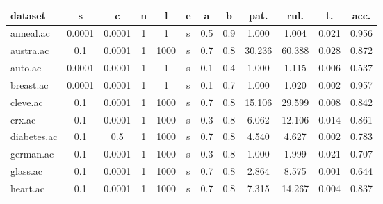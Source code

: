 \begin{table}[htbp]
	\centering
		\begin{tabular}{|l|c|c|c|c|c|c|c||c|c|c|c|}
		\hline
		\textbf{dataset}	& \textbf{s}	& \textbf{c}	& \textbf{n}	& \textbf{l}	& \textbf{e} & \textbf{a} & \textbf{b} & \textbf{pat.}	& \textbf{rul.}	& \textbf{t.}	& \textbf{acc.}	\\
		\hline
		anneal.ac      & 0.0001   & 0.0001      & 1              & 1                   & s        & 0.5    & 0.9   & 1.000          & 1.004          & 0.021          & 0.956          \\
		\hline
		austra.ac      & 0.1      & 0.0001      & 1              & 1000                & s        & 0.7    & 0.8   & 30.236         & 60.388         & 0.028          & 0.872          \\
		\hline
		auto.ac        & 0.0001   & 0.0001      & 1              & 1                   & s        & 0.1    & 0.4   & 1.000          & 1.115          & 0.006          & 0.537          \\
		\hline
		breast.ac      & 0.0001   & 0.0001      & 1              & 1                   & s        & 0.1    & 0.7   & 1.000          & 1.020          & 0.002          & 0.957          \\
		\hline
		cleve.ac       & 0.1      & 0.0001      & 1              & 1000                & s        & 0.7    & 0.8   & 15.106         & 29.599         & 0.008          & 0.842          \\
		\hline
		crx.ac         & 0.1      & 0.0001      & 1              & 1000                & s        & 0.3    & 0.8   & 6.062          & 12.106         & 0.014          & 0.861          \\
		\hline
		diabetes.ac    & 0.1      & 0.5         & 1              & 1000                & s        & 0.7    & 0.8   & 4.540          & 4.627          & 0.002          & 0.783          \\
		\hline
		german.ac      & 0.1      & 0.0001      & 1              & 1000                & s        & 0.3    & 0.8   & 1.000          & 1.999          & 0.021          & 0.707          \\
		\hline
		glass.ac       & 0.1      & 0.0001      & 1              & 1000                & s        & 0.7    & 0.8   & 2.864          & 8.575          & 0.001          & 0.644          \\
		\hline
		heart.ac       & 0.1      & 0.0001      & 1              & 1000                & s        & 0.7    & 0.8   & 7.315          & 14.267         & 0.004          & 0.837          \\

\end{tabular}
\end{table}
